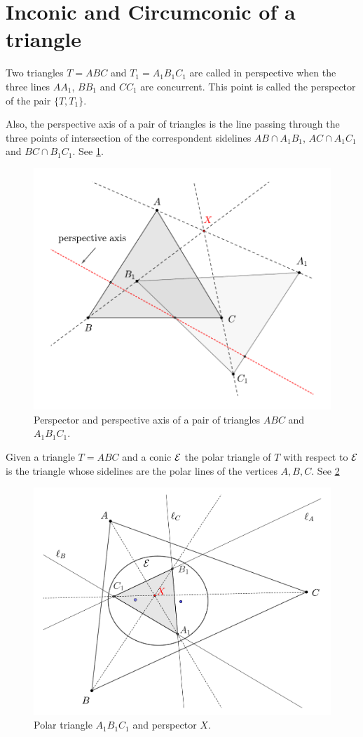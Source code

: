 
\section{Inconic and Circumconic of a triangle}
\label{app:A-inconic}

Two triangles $T=ABC$ and $T_1=A_1B_1C_1$ are called in perspective when  the three lines $AA_1$, $BB_1$ and $CC_1$ are concurrent. This point is called the perspector of the pair $\{T,T_1\}$.

Also, the perspective axis of a pair of triangles is the line passing through the   three points of intersection of the correspondent sidelines $AB\cap A_1B_1$,
$AC\cap A_1C_1$ and $BC\cap B_1C_1$.
See \cref{fig:appA-perspector}.

\begin{figure}
    \centering
    \includegraphics[trim=0 0 0 30, clip,width=.8\textwidth]{zappA/pics/pics-appA-101-perspector.pdf}
    \caption{Perspector and perspective axis of a pair of triangles $ABC$ and $A_1B_1C_1$.}
    \label{fig:appA-perspector}
\end{figure}

Given a triangle $T=ABC$ and a conic $\mathcal{E}$ the polar triangle of $T$ with respect to $\mathcal{E}$ is the triangle whose sidelines are the polar lines of the vertices   $A,B,C$. See \cref{fig:appA-polar-triangle}
\begin{figure}
    \centering
    \includegraphics[trim=0 0 0 60, clip,width=.8\textwidth]{zappA/pics/pics-appA-150-perspector-triangle-ellipse.pdf}
    \caption{Polar triangle $A_1B_1C_1$ and perspector $X$.}
    \label{fig:appA-polar-triangle}
\end{figure}

